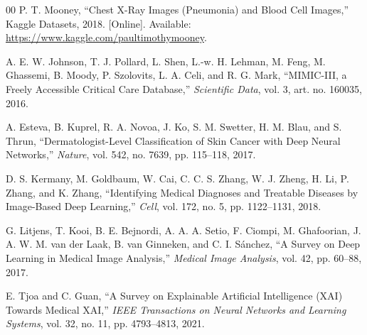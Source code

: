 \documentclass[conference]{IEEEtran}
\begin{document}
\begin{thebibliography}{00}
 P. T. Mooney, ``Chest X-Ray Images (Pneumonia) and Blood Cell Images,'' Kaggle Datasets, 2018. [Online]. Available: \url{https://www.kaggle.com/paultimothymooney}.

 A. E. W. Johnson, T. J. Pollard, L. Shen, L.-w. H. Lehman, M. Feng, M. Ghassemi, B. Moody, P. Szolovits, L. A. Celi, and R. G. Mark, ``MIMIC-III, a Freely Accessible Critical Care Database,'' \emph{Scientific Data}, vol. 3, art. no. 160035, 2016.

 A. Esteva, B. Kuprel, R. A. Novoa, J. Ko, S. M. Swetter, H. M. Blau, and S. Thrun, ``Dermatologist-Level Classification of Skin Cancer with Deep Neural Networks,'' \emph{Nature}, vol. 542, no. 7639, pp. 115--118, 2017.

 D. S. Kermany, M. Goldbaum, W. Cai, C. C. S. Zhang, W. J. Zheng, H. Li, P. Zhang, and K. Zhang, ``Identifying Medical Diagnoses and Treatable Diseases by Image-Based Deep Learning,'' \emph{Cell}, vol. 172, no. 5, pp. 1122--1131, 2018.

 G. Litjens, T. Kooi, B. E. Bejnordi, A. A. A. Setio, F. Ciompi, M. Ghafoorian, J. A. W. M. van der Laak, B. van Ginneken, and C. I. Sánchez, ``A Survey on Deep Learning in Medical Image Analysis,'' \emph{Medical Image Analysis}, vol. 42, pp. 60--88, 2017.

 E. Tjoa and C. Guan, ``A Survey on Explainable Artificial Intelligence (XAI) Towards Medical XAI,'' \emph{IEEE Transactions on Neural Networks and Learning Systems}, vol. 32, no. 11, pp. 4793--4813, 2021.

\end{thebibliography}
\end{document}
